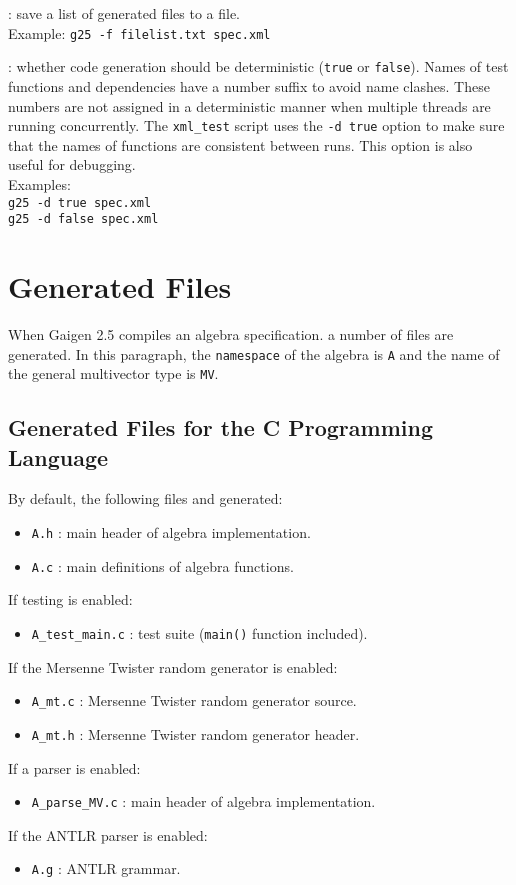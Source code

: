 \documentclass[10pt, a4paper]{article}
\begin{document}
: save a list of generated files to a file.\\
Example: {\tt g25 -f filelist.txt spec.xml}

\vspace*{2mm}

: whether code generation should be deterministic ({\tt true} or {\tt false}).
Names of test functions and dependencies have a number suffix to avoid name clashes. These
numbers are not assigned in a deterministic manner when multiple threads are running concurrently.
The {\tt xml\_test} script uses the {\tt -d true} option to make sure that the names of functions are
consistent between runs. This option is also useful for debugging.
\\
Examples: \\
{\tt g25 -d true spec.xml}\\
{\tt g25 -d false spec.xml}

\section{Generated Files}

When Gaigen 2.5 compiles an algebra specification. a number of files
are generated.
In this paragraph, the {\tt namespace} of the algebra is {\tt A} and
the name of the general multivector type is {\tt MV}.

\subsection{Generated Files for the C Programming Language}

By default, the following files and generated:
\begin{itemize}
\item {\tt A.h} : main header of algebra implementation.
\item {\tt A.c} : main definitions of algebra functions.
\end{itemize}
If testing is enabled:
\begin{itemize}
\item {\tt A\_test\_main.c} : test suite ({\tt main()} function included).
\end{itemize}
If the Mersenne Twister random generator is enabled:
\begin{itemize}
\item {\tt A\_mt.c} : Mersenne Twister random generator source.
\item {\tt A\_mt.h} : Mersenne Twister random generator header.
\end{itemize}
If a parser is enabled:
\begin{itemize}
\item {\tt A\_parse\_MV.c} : main header of algebra implementation.
\end{itemize}
If the ANTLR parser is enabled:
\begin{itemize}
\item {\tt A.g} : ANTLR grammar.
\end{itemize}
\end{document}
